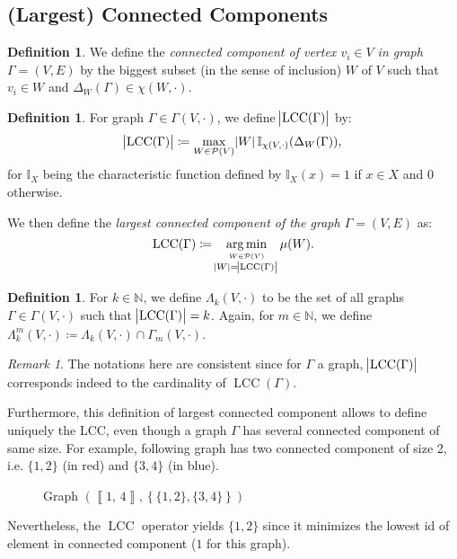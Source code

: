 \documentclass{article}
\theoremstyle{definition}
\newtheorem{definition}[lemma]{Definition}
\theoremstyle{remark}
\newtheorem*{remark}{Remark}
\DeclareMathOperator{\LCC}{LCC}
\DeclareMathOperator*{\argmin}{arg\,min}
\newcommand{\N}{\mathbb N}
\newcommand{\intint}[2]{\left\llbracket#1, \, #2\right\rrbracket}
\begin{document}
	\subsection{(Largest) Connected Components}
		\begin{definition} We define the \textit{connected component of vertex $v_i \in V$ in graph $\Gamma = (V, E)$} by the biggest subset (in the sense of inclusion) $W$
		of $V$ such that $v_i \in W$ and $\Delta_W(\Gamma) \in \chi(W, \cdot)$.
		\end{definition}

		\begin{definition}
		For graph $\Gamma \in \Gamma(V, \cdot)$, we define $\abs {\LCC(\Gamma)}$ by:
		\[\abs {\LCC(\Gamma)} \coloneqq \max_{W \in \mathcal P(V)}\abs W\mathbb I_{\chi(V, \cdot)}(\Delta_W(\Gamma)),\]
		for $\mathbb I_X$ being the characteristic function defined by $\mathbb I_X(x) = 1$ if $x \in X$ and 0 otherwise.

		We then define the \textit{largest connected component of the graph $\Gamma = (V, E)$} as:
		\[\LCC(\Gamma) \coloneqq \argmin_{\stackrel {W \in \mathcal P(V)}{\abs W = \abs {\LCC(\Gamma)}}} \mu(W).\]
		\end{definition}

		\begin{definition}
		For $k \in \N$, we define $\Lambda_k(V, \cdot)$ to be the set of all graphs $\Gamma \in \Gamma(V, \cdot)$ such that $\abs {\LCC(\Gamma)} = k$. Again, for $m \in \N$,
		we define $\Lambda_k^m(V, \cdot) \coloneqq \Lambda_k(V, \cdot) \cap \Gamma_m(V, \cdot)$.
		\end{definition}

		\begin{remark} The notations here are consistent since for $\Gamma$ a graph, $\abs {\LCC(\Gamma)}$ corresponds indeed to the cardinality of $\LCC(\Gamma)$.

		Furthermore, this definition of largest connected component allows to define uniquely the LCC, even though a graph $\Gamma$ has several connected component
		of same size. For example, following graph has two connected component of size 2, i.e. $\{1, 2\}$ (in red) and $\{3, 4\}$ (in blue).

		\begin{figure}[H]
		\begin{center}
		\end{center}
		\caption{Graph $\left(\intint 14, \left\{\{1, 2\}, \{3, 4\}\right\}\right)$}
		\end{figure}

		Nevertheless, the $\LCC$ operator yields $\{1, 2\}$ since it minimizes the lowest id of element in connected component ($1$ for this graph).
		\end{remark}
\end{document}
